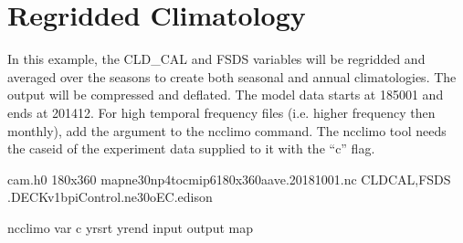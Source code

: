 \documentclass[letterpaper,10pt,english]{sphinxmanual}
\begin{document}
\section{Regridded Climatology}
\label{\detokenize{atm_regrid:regridded-climatology}}
In this example, the CLD\_CAL and FSDS variables will be regridded and averaged over the seasons to create both seasonal and annual climatologies.
The output will be compressed and deflated. The model data starts at 1850\sphinxhyphen{}01 and ends at 2014\sphinxhyphen{}12. For high temporal frequency files
(i.e. higher frequency then monthly), add the  argument to the ncclimo command. The ncclimo tool needs the caseid of the
experiment data supplied to it with the “\sphinxhyphen{}c” flag.

\begin{sphinxVerbatim}[commandchars=\\\{\}]

cam.h0
180x360
map\PYGZus{}ne30np4\PYGZus{}to\PYGZus{}cmip6\PYGZus{}180x360\PYGZus{}aave.20181001.nc   
CLD\PYGZus{}CAL,FSDS                                       
                                              
                                                
                                  
.DECKv1b\PYGZus{}piControl.ne30\PYGZus{}oEC.edison       

ncclimo 
   
  \PYGZhy{}\PYGZhy{}var 
  \PYGZhy{}c  
  \PYGZhy{}\PYGZhy{}yr\PYGZus{}srt 
  \PYGZhy{}\PYGZhy{}yr\PYGZus{}end 
  \PYGZhy{}\PYGZhy{}input 
  \PYGZhy{}\PYGZhy{}output 
  \PYGZhy{}\PYGZhy{}map
\end{sphinxVerbatim}
\end{document}
